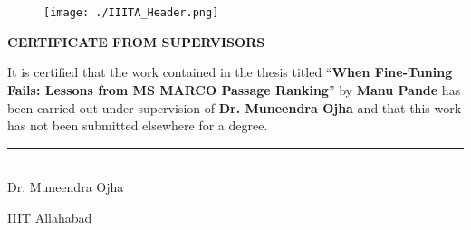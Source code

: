 \begin{spacing}{2.0}
\begin{flushright}
    \begin{minipage}{0.5\textwidth}
        \flushright \vspace{60 pt}
        \underline{\hspace{6cm}} \\
         \\[80pt]
    \end{minipage}
\end{flushright}
\end{spacing}
\newpage

\checktoopen
\begin{figure}[htp]
    \texttt{[image: ./IIITA\_Header.png]}
\end{figure}
\thispagestyle{empty}
\vspace*{.06\textheight}

\begin{spacing}{1.5}
\begin{center}
    {\centering\large\bfseries CERTIFICATE FROM SUPERVISORS\par\vspace{10pt}}
\end{center}

\noindent It is certified that the work contained in the thesis titled \enquote{\textbf{When Fine-Tuning Fails: Lessons from MS MARCO Passage Ranking}} by \textbf{Manu Pande} has been carried out under supervision of \textbf{Dr. Muneendra Ojha} and that this work has not been submitted elsewhere for a degree.

\vspace{3.5cm}

\hfill\begin{minipage}{7.5cm}
    \begin{spacing}{1.2}
        \par
        \rule{\textwidth}{0.2pt}\\
        {Dr. Muneendra Ojha} \par
        {\deptname}  \par
        IIIT Allahabad \par
    \end{spacing}
\end{minipage}

\end{spacing}
\cleardoublepage

